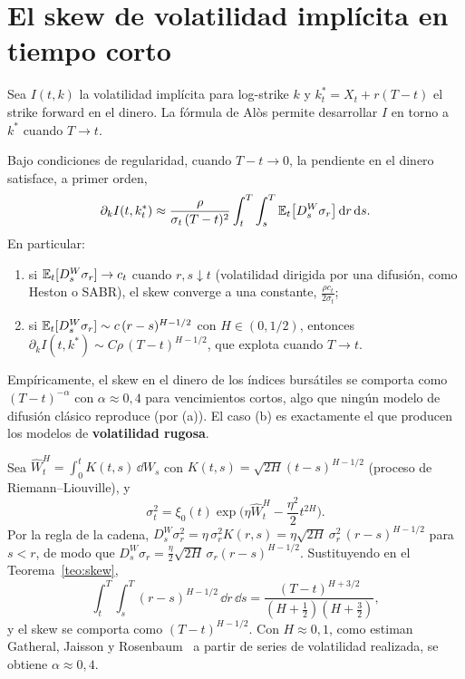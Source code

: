 \section{El skew de volatilidad implícita en tiempo corto}
Sea $I(t,k)$ la volatilidad implícita para log-strike $k$ y $k_t^*=X_t+r(T-t)$ el strike forward en el
dinero. La fórmula de Alòs permite desarrollar $I$ en torno a $k^*$ cuando $T\to t$.

\begin{teorema}\label{teo:skew}
Bajo condiciones de regularidad,
cuando $T-t\to0$, la pendiente en el dinero satisface, a primer orden,
\[
  \partial_kI(t,k_t^*)\approx\frac{\rho}{\sigma_t\,(T-t)^2}\int_t^T\int_s^T\mathbb{E}_t\big[D^W_s\sigma_r\big]\,\mathrm{d} r\,\mathrm{d} s.
\]
En particular:
\begin{enumerate}[label=(\alph*)]
  \item si $\mathbb{E}_t[D^W_s\sigma_r]\to c_t$ cuando $r,s\downarrow t$ (volatilidad dirigida por una difusión, como Heston o
  SABR), el skew converge a una constante, $\frac{\rho c_t}{2\sigma_t}$;
  \item si $\mathbb{E}_t[D^W_s\sigma_r]\sim c\,(r-s)^{H-1/2}$ con $H\in(0,1/2)$, entonces $\partial_kI(t,k^*)\sim C\rho\,(T-t)^{H-1/2}$,
  que explota cuando $T\to t$.
\end{enumerate}
\end{teorema}

Empíricamente, el skew en el dinero de los índices bursátiles se comporta como $(T-t)^{-\alpha}$
con $\alpha\approx0{,}4$ para vencimientos cortos, algo que ningún modelo de difusión clásico reproduce
(por (a)). El caso (b) es exactamente el que producen los modelos de \textbf{volatilidad rugosa}.

\begin{ejemplo}
Sea $\hat W^H_t=\int_0^tK(t,s)\,\dd W_s$ con $K(t,s)=\sqrt{2H}(t-s)^{H-1/2}$
(proceso de Riemann--Liouville), y
\[
  \sigma_t^2=\xi_0(t)\exp\Big(\eta\hat W^H_t-\frac{\eta^2}{2}t^{2H}\Big).
\]
Por la regla de la cadena, $D^W_s\sigma_r^2=\eta\,\sigma_r^2K(r,s)=\eta\sqrt{2H}\,\sigma_r^2\,(r-s)^{H-1/2}$ para $s<r$, de modo
que $D^W_s\sigma_r=\frac\eta2\sqrt{2H}\,\sigma_r(r-s)^{H-1/2}$. Sustituyendo en el Teorema~\ref{teo:skew},
\[
  \int_t^T\int_s^T(r-s)^{H-1/2}\,\dd r\,\dd s=\frac{(T-t)^{H+3/2}}{(H+\frac12)(H+\frac32)},
\]
y el skew se comporta como $(T-t)^{H-1/2}$. Con $H\approx0{,}1$, como estiman Gatheral, Jaisson y
Rosenbaum~\cite{GatheralJaissonRosenbaum18} a partir de series de volatilidad realizada, se obtiene $\alpha\approx0{,}4$.
\end{ejemplo}

